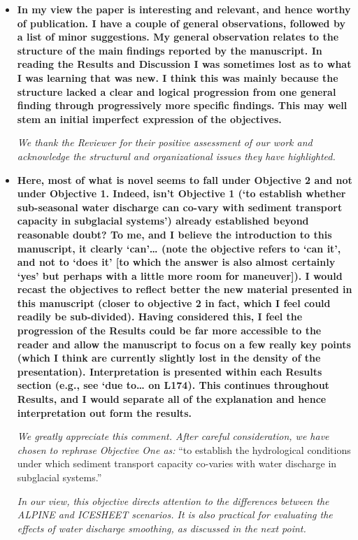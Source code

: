 \documentclass[11pt]{article}
\begin{document}
\begin{itemize}

\item \textbf{In my view the paper is interesting and relevant, and hence worthy of publication. I have a couple
    of general observations, followed by a list of minor suggestions.
    My general observation relates to the structure of the main findings reported by the manuscript.
    In reading the Results and Discussion I was sometimes lost as to what I was learning that was new.
    I think this was mainly because the structure lacked a clear and logical progression from one
    general finding through progressively more specific findings. This may well stem an initial
    imperfect expression of the objectives.}

  \textit{We thank the Reviewer for their positive assessment of our work and acknowledge the structural and organizational issues they have highlighted.}
  
\item  \textbf{Here, most of what is novel seems to fall under Objective
    2 and not under Objective 1. Indeed, isn’t Objective 1 (‘to establish whether sub-seasonal water
    discharge can co-vary with sediment transport capacity in subglacial systems’) already established
    beyond reasonable doubt? To me, and I believe the introduction to this manuscript, it clearly
    ‘can’… (note the objective refers to ‘can it’, and not to ‘does it’ [to which the answer is also almost
    certainly ‘yes’ but perhaps with a little more room for maneuver]). I would recast the objectives
    to reflect better the new material presented in this manuscript (closer to objective 2 in fact, which
    I feel could readily be sub-divided). Having considered this, I feel the progression of the Results
    could be far more accessible to the reader and allow the manuscript to focus on a few really key
    points (which I think are currently slightly lost in the density of the presentation).
    Interpretation is presented within each Results section (e.g., see ‘due to… on L174). This
    continues throughout Results, and I would separate all of the explanation and hence
    interpretation out form the results.}

  \textit{We greatly appreciate this comment. After careful consideration, we have chosen to rephrase Objective One as:} ``to establish the hydrological conditions under which sediment transport capacity co-varies with water discharge in subglacial systems.'' 

\textit{In our view, this objective directs attention to the differences between the ALPINE and ICESHEET scenarios. It is also practical for evaluating the effects of water discharge smoothing, as discussed in the next point.}


\end{itemize}
\end{document}
